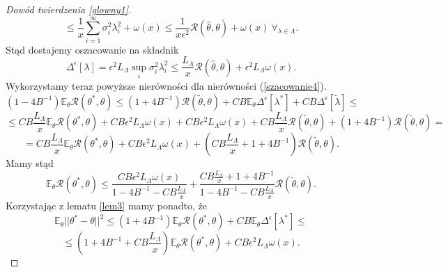 \documentclass{mwart}
\begin{document}
\begin{proof}[Dowód twierdzenia \ref{glowny1}]
\begin{displaymath}
\end{displaymath}
\begin{displaymath}
\leq \frac{1}{x}\sum_{i=1}^{\infty}\sigma_i^2\lambda_i^2+\omega (x)\leq \frac{1}{x\epsilon^2}\mathcal{R}(\hat{\theta},\theta)+\omega (x)\ \forall_{\lambda\in \Lambda}.
\end{displaymath}
Stąd dostajemy oszacowanie na składnik
\begin{displaymath}
\Delta^{\epsilon}[\lambda]=\epsilon^2 L_{\Lambda}\sup_i\sigma_i^2\lambda_i^2\leq \frac{L_{\Lambda}}{x}\mathcal{R}(\hat{\theta},\theta)+\epsilon^2L_{\Lambda}\omega (x).
\end{displaymath}
Wykorzystamy teraz powyższe nierówności dla nierówności (\ref{szacowanie4}).
\begin{displaymath}
(1-4B^{-1})\mathbb{E}_{\theta}\mathcal{R}(\theta^*,\theta)\leq (1+4B^{-1})\mathcal{R}(\tilde{\theta},\theta)+CB\mathbb{E}_{\theta}\Delta^{\epsilon}[\lambda^*]+CB\Delta^{\epsilon}[\tilde{\lambda}]\leq 
\end{displaymath}
\begin{displaymath}
\leq CB\frac{L_{\Lambda}}{x}\mathbb{E}_{\theta}\mathcal{R}(\theta^*,\theta)+CB\epsilon^2L_{\Lambda}\omega (x)+CB\epsilon^2L_{\Lambda}\omega (x)+CB\frac{L_{\Lambda}}{x}\mathcal{R}(\tilde{\theta},\theta)+(1+4B^{-1})\mathcal{R}(\tilde{\theta},\theta)=
\end{displaymath}
\begin{displaymath}
=CB\frac{L_{\Lambda}}{x}\mathbb{E}_{\theta}\mathcal{R}(\theta^*,\theta)+CB\epsilon^2L_{\Lambda}\omega (x)+\left(CB\frac{L_{\Lambda}}{x}+1+4B^{-1}\right)\mathcal{R}(\tilde{\theta},\theta).
\end{displaymath}
Mamy stąd
\begin{displaymath}
\mathbb{E}_{\theta}\mathcal{R}(\theta^*,\theta)\leq \frac{CB\epsilon^2L_{\Lambda}\omega (x)}{1-4B^{-1}-CB\frac{L_{\Lambda}}{x}}+\frac{CB\frac{L_{\Lambda}}{x}+1+4B^{-1}}{1-4B^{-1}-CB\frac{L_{\Lambda}}{x}}\mathcal{R}(\tilde{\theta},\theta).
\end{displaymath}
Korzystając z lematu \ref{lem3} mamy ponadto, że
\begin{displaymath}
\mathbb{E}_{\theta}||\theta^*-\theta||^2\leq (1+4B^{-1})\mathbb{E}_{\theta}\mathcal{R}(\theta^*,\theta)+CB\mathbb{E}_{\theta}\Delta^{\epsilon}[\lambda^*]\leq
\end{displaymath}
\begin{displaymath}
\leq (1+4B^{-1}+CB\frac{L_{\Lambda}}{x})\mathbb{E}_{\theta}\mathcal{R}(\theta^*,\theta)+CB\epsilon^2L_{\Lambda}\omega (x).

\end{displaymath}
\end{proof}
\end{document}

